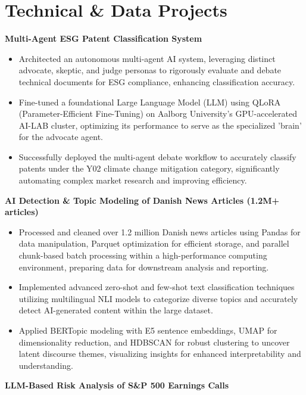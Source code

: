 \documentclass[10pt, letterpaper]{article}
\begin{document}
\section{Technical \& Data Projects}
\noindent\textbf{Multi-Agent ESG Patent Classification System}
\begin{itemize}[leftmargin=0.15in, topsep=0pt, partopsep=0pt, itemsep=-2pt]
    \item Architected an autonomous multi-agent AI system, leveraging distinct advocate, skeptic, and judge personas to rigorously evaluate and debate technical documents for ESG compliance, enhancing classification accuracy.
    \item Fine-tuned a foundational Large Language Model (LLM) using QLoRA (Parameter-Efficient Fine-Tuning) on Aalborg University's GPU-accelerated AI-LAB cluster, optimizing its performance to serve as the specialized 'brain' for the advocate agent.
    \item Successfully deployed the multi-agent debate workflow to accurately classify patents under the Y02 climate change mitigation category, significantly automating complex market research and improving efficiency.
\end{itemize}
\vspace{4pt}
\noindent\textbf{AI Detection \& Topic Modeling of Danish News Articles (1.2M+ articles)}
\begin{itemize}[leftmargin=0.15in, topsep=0pt, partopsep=0pt, itemsep=-2pt]
    \item Processed and cleaned over 1.2 million Danish news articles using Pandas for data manipulation, Parquet optimization for efficient storage, and parallel chunk-based batch processing within a high-performance computing environment, preparing data for downstream analysis and reporting.
    \item Implemented advanced zero-shot and few-shot text classification techniques utilizing multilingual NLI models to categorize diverse topics and accurately detect AI-generated content within the large dataset.
    \item Applied BERTopic modeling with E5 sentence embeddings, UMAP for dimensionality reduction, and HDBSCAN for robust clustering to uncover latent discourse themes, visualizing insights for enhanced interpretability and understanding.
\end{itemize}
\vspace{4pt}
\noindent\textbf{LLM-Based Risk Analysis of S\&P 500 Earnings Calls}
\end{document}
